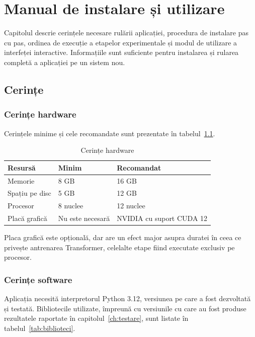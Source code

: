 \chapter{Manual de instalare și utilizare}\label{ch:manual}
\pagestyle{fancy}

Capitolul descrie cerințele necesare rulării aplicației, procedura de instalare pas cu pas, ordinea de execuție a etapelor experimentale și modul de utilizare a interfeței interactive. Informațiile sunt suficiente pentru instalarea și rularea completă a aplicației pe un sistem nou.

\section{Cerințe}\label{sec:cerinte}

\subsection{Cerințe hardware}\label{subsec:hardware}

Cerințele minime și cele recomandate sunt prezentate în tabelul~\ref{tab:hardware}.

\begin{table}[!ht]
    \caption{Cerințe hardware}
    \centering
    \begin{tabular}{|l|p{3.6cm}|p{4.4cm}|}
        \hline
        \textbf{Resursă} & \textbf{Minim} & \textbf{Recomandat} \\
        \hline
        Memorie & 8 GB & 16 GB \\
        \hline
        Spațiu pe disc & 5 GB & 12 GB \\
        \hline
        Procesor & 8 nuclee & 12 nuclee \\
        \hline
        Placă grafică & Nu este necesară & NVIDIA cu suport CUDA 12 \\
        \hline
    \end{tabular}
    \label{tab:hardware}
\end{table}

Placa grafică este opțională, dar are un efect major asupra duratei în ceea ce privește antrenarea Transformer, celelalte etape fiind executate exclusiv pe procesor.

\subsection{Cerințe software}\label{subsec:software}

Aplicația necesită interpretorul Python 3.12, versiunea pe care a fost dezvoltată și testată. Bibliotecile utilizate, împreună cu versiunile cu care au fost produse rezultatele raportate în capitolul~\ref{ch:testare}, sunt listate în tabelul~\ref{tab:biblioteci}.

